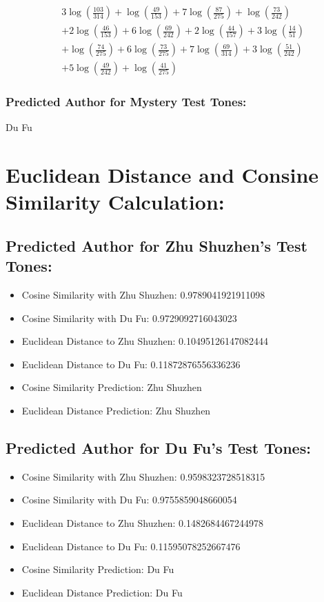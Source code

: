 \documentclass[12pt]{article}
\begin{document}
\[
\begin{aligned}
    &3 \log\left(\frac{103}{314}\right) + \log\left(\frac{49}{153}\right) + 7 \log\left(\frac{87}{275}\right) + \log\left(\frac{73}{242}\right) \\
    &+ 2 \log\left(\frac{46}{153}\right) + 6 \log\left(\frac{69}{242}\right) + 2 \log\left(\frac{44}{157}\right) + 3 \log\left(\frac{14}{51}\right) \\
    &+ \log\left(\frac{74}{275}\right) + 6 \log\left(\frac{73}{275}\right) + 7 \log\left(\frac{69}{314}\right) + 3 \log\left(\frac{51}{242}\right) \\
    &+ 5 \log\left(\frac{49}{242}\right) + \log\left(\frac{41}{275}\right)
\end{aligned}
\]

\subsubsection*{Predicted Author for Mystery Test Tones: }
Du Fu

\section*{Euclidean Distance and Consine Similarity Calculation: }

\subsection*{Predicted Author for Zhu Shuzhen's Test Tones:}

\begin{itemize}
    \item Cosine Similarity with Zhu Shuzhen: 0.9789041921911098
    \item Cosine Similarity with Du Fu: 0.9729092716043023
    \item Euclidean Distance to Zhu Shuzhen: 0.10495126147082444
    \item Euclidean Distance to Du Fu: 0.11872876556336236
    \item Cosine Similarity Prediction: Zhu Shuzhen
    \item Euclidean Distance Prediction: Zhu Shuzhen
\end{itemize}

\subsection*{Predicted Author for Du Fu's Test Tones:}

\begin{itemize}
    \item Cosine Similarity with Zhu Shuzhen: 0.9598323728518315
    \item Cosine Similarity with Du Fu: 0.9755859048660054
    \item Euclidean Distance to Zhu Shuzhen: 0.1482684467244978
    \item Euclidean Distance to Du Fu: 0.11595078252667476
    \item Cosine Similarity Prediction: Du Fu
    \item Euclidean Distance Prediction: Du Fu
\end{itemize}
\end{document}
